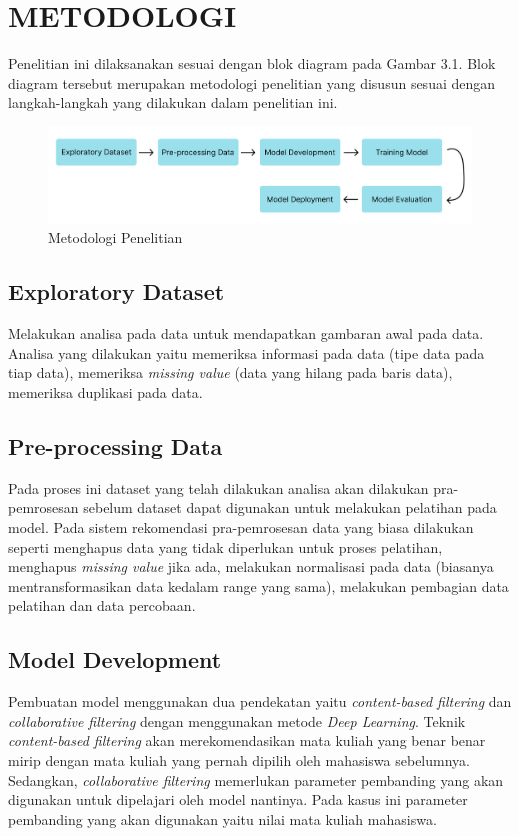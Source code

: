\chapter{METODOLOGI}

Penelitian ini dilaksanakan sesuai dengan blok diagram pada Gambar 3.1. Blok diagram tersebut
merupakan metodologi penelitian yang disusun sesuai dengan langkah-langkah yang dilakukan dalam penelitian ini.

\begin{figure} [ht] \centering
  \includegraphics[width=160mm]{gambar/diagram-blok.png}
  \caption{Metodologi Penelitian}
\end{figure}


\section{Exploratory Dataset}
Melakukan analisa pada data untuk mendapatkan gambaran awal pada data. Analisa yang dilakukan yaitu
memeriksa informasi pada data (tipe data pada tiap data), memeriksa \emph{missing value} {(data yang hilang pada baris data)},
memeriksa duplikasi pada data.


\section{Pre-processing Data}
Pada proses ini dataset yang telah dilakukan analisa akan dilakukan pra-pemrosesan sebelum dataset dapat digunakan
untuk melakukan pelatihan pada model. Pada sistem rekomendasi pra-pemrosesan data yang biasa dilakukan seperti menghapus data
yang tidak diperlukan untuk proses pelatihan, menghapus \emph{missing value} jika ada, melakukan normalisasi pada data (biasanya mentransformasikan data kedalam range yang sama),
melakukan pembagian data pelatihan dan data percobaan.

\section{Model Development}
Pembuatan model menggunakan dua pendekatan yaitu \emph{content-based filtering} dan \emph{collaborative filtering} dengan menggunakan metode \emph{Deep Learning}. Teknik
\emph{content-based filtering} akan merekomendasikan mata kuliah yang benar benar mirip dengan mata kuliah yang pernah dipilih oleh mahasiswa sebelumnya. Sedangkan, \emph{collaborative filtering}
memerlukan parameter pembanding yang akan digunakan untuk dipelajari oleh model nantinya. Pada kasus ini parameter pembanding yang akan digunakan yaitu nilai mata kuliah mahasiswa.

